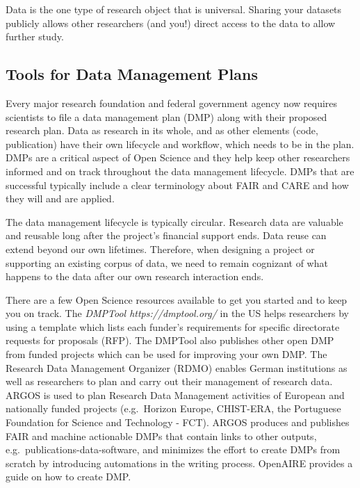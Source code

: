 \documentclass[
  letterpaper,
  DIV=11,
  numbers=noendperiod]{scrreport}
\begin{document}
Data is the one type of research object that is universal. Sharing your
datasets publicly allows other researchers (and you!) direct access to
the data to allow further study.

\hypertarget{tools-for-data-management-plans}{%
\subsection{Tools for Data Management
Plans}\label{tools-for-data-management-plans}}

Every major research foundation and federal government agency now
requires scientists to file a data management plan (DMP) along with
their proposed research plan. Data as research in its whole, and as
other elements (code, publication) have their own lifecycle and
workflow, which needs to be in the plan. DMPs are a critical aspect of
Open Science and they help keep other researchers informed and on track
throughout the data management lifecycle. DMPs that are successful
typically include a clear terminology about FAIR and CARE and how they
will and are applied.

The data management lifecycle is typically circular. Research data are
valuable and reusable long after the project's financial support ends.
Data reuse can extend beyond our own lifetimes. Therefore, when
designing a project or supporting an existing corpus of data, we need to
remain cognizant of what happens to the data after our own research
interaction ends.

There are a few Open Science resources available to get you started and
to keep you on track. The \emph{DMPTool https://dmptool.org/} in the US
helps researchers by using a template which lists each funder's
requirements for specific directorate requests for proposals (RFP). The
DMPTool also publishes other open DMP from funded projects which can be
used for improving your own DMP. The Research Data Management Organizer
(RDMO) enables German institutions as well as researchers to plan and
carry out their management of research data. ARGOS is used to plan
Research Data Management activities of European and nationally funded
projects (e.g.~Horizon Europe, CHIST-ERA, the Portuguese Foundation for
Science and Technology - FCT). ARGOS produces and publishes FAIR and
machine actionable DMPs that contain links to other outputs,
e.g.~publications-data-software, and minimizes the effort to create DMPs
from scratch by introducing automations in the writing process. OpenAIRE
provides a guide on how to create DMP.
\end{document}
